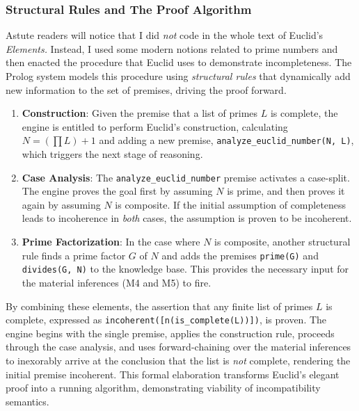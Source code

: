 \documentclass[12pt]{book}
\begin{document}
\subsubsection{Structural Rules and The Proof Algorithm}

Astute readers will notice that I did \textit{not} code in the whole text of Euclid's \textit{Elements.} Instead, I used some modern notions related to prime numbers and then enacted the procedure that Euclid uses to demonstrate incompleteness. The Prolog system models this procedure using \textit{structural rules} that dynamically add new information to the set of premises, driving the proof forward.

\begin{enumerate}
    \item \textbf{Construction}: Given the premise that a list of primes $L$ is complete, the engine is entitled to perform Euclid's construction, calculating $N = (\prod L) + 1$ and adding a new premise, \texttt{analyze\_euclid\_number(N, L)}, which triggers the next stage of reasoning.

    \item \textbf{Case Analysis}: The \texttt{analyze\_euclid\_number} premise activates a case-split. The engine proves the goal first by assuming $N$ is prime, and then proves it again by assuming $N$ is composite. If the initial assumption of completeness leads to incoherence in \textit{both} cases, the assumption is proven to be incoherent.

    \item \textbf{Prime Factorization}: In the case where $N$ is composite, another structural rule finds a prime factor $G$ of $N$ and adds the premises \texttt{prime(G)} and \texttt{divides(G, N)} to the knowledge base. This provides the necessary input for the material inferences (M4 and M5) to fire.
\end{enumerate}

By combining these elements, the assertion that any finite list of primes $L$ is complete, expressed as \texttt{incoherent([n(is\_complete(L))])}, is proven. The engine begins with the single premise, applies the construction rule, proceeds through the case analysis, and uses forward-chaining over the material inferences to inexorably arrive at the conclusion that the list is \textit{not} complete, rendering the initial premise incoherent. This formal elaboration transforms Euclid's elegant proof into a running algorithm, demonstrating viability of incompatibility semantics.
\end{document}
